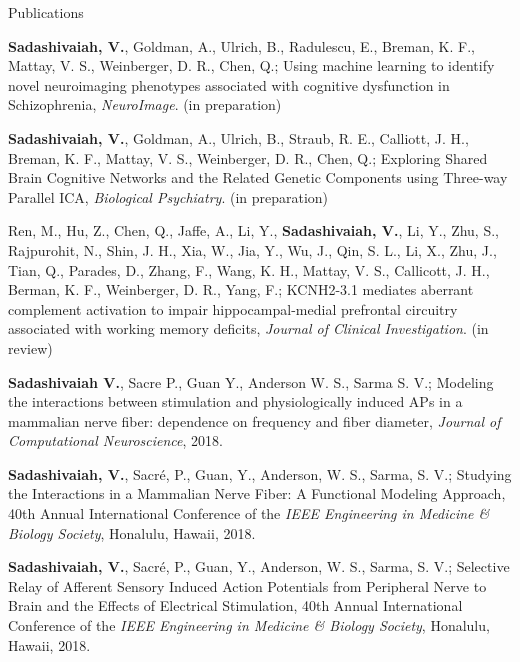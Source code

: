 \documentclass{resume}
\begin{document}
\vspace{1em} 

\begin{rSection}{Publications}
\begin{publications}
\item \textbf{Sadashivaiah, V.}, Goldman, A., Ulrich, B., Radulescu, E., Breman, K. F., Mattay, V. S., Weinberger, D. R., Chen, Q.; Using machine learning to identify novel neuroimaging phenotypes associated with cognitive dysfunction in Schizophrenia, \textit{NeuroImage}. (in preparation)
 
\item \textbf{Sadashivaiah, V.}, Goldman, A., Ulrich, B., Straub, R. E., Calliott, J. H., Breman, K. F., Mattay, V. S., Weinberger, D. R., Chen, Q.; Exploring Shared Brain Cognitive Networks and the Related Genetic Components using Three-way Parallel ICA, \textit{Biological Psychiatry}. (in preparation) 

\item Ren, M., Hu, Z., Chen, Q., Jaffe, A., Li, Y., \textbf{Sadashivaiah, V.}, Li, Y., Zhu, S., Rajpurohit, N., Shin, J. H., Xia, W., Jia, Y., Wu, J., Qin, S. L., Li, X., Zhu, J., Tian, Q., Parades, D., Zhang, F., Wang, K. H., Mattay, V. S., Callicott, J. H., Berman, K. F., Weinberger, D. R., Yang, F.; KCNH2-3.1 mediates aberrant complement activation to impair hippocampal-medial prefrontal circuitry associated with working memory deficits, \textit{Journal of Clinical Investigation}. (in review)

\item \textbf{Sadashivaiah V.}, Sacre P., Guan Y., Anderson W. S., Sarma S. V.; Modeling the interactions between stimulation and physiologically induced APs in a mammalian nerve fiber: dependence on frequency and fiber diameter, \textit{Journal of Computational Neuroscience}, 2018.

\item \textbf{Sadashivaiah, V.}, Sacré, P., Guan, Y., Anderson, W. S., Sarma, S. V.; Studying the Interactions in a Mammalian Nerve Fiber: A Functional Modeling Approach, 40th Annual International Conference of the \textit{IEEE Engineering in Medicine \& Biology Society}, Honalulu, Hawaii, 2018.

\item \textbf{Sadashivaiah, V.}, Sacré, P., Guan, Y., Anderson, W. S., Sarma, S. V.; Selective Relay of Afferent Sensory Induced Action Potentials from Peripheral Nerve to Brain and the Effects of Electrical Stimulation, 40th Annual International Conference of the \textit{IEEE Engineering in Medicine \& Biology Society}, Honalulu, Hawaii, 2018.


\end{publications}
\end{rSection}
\end{document}
